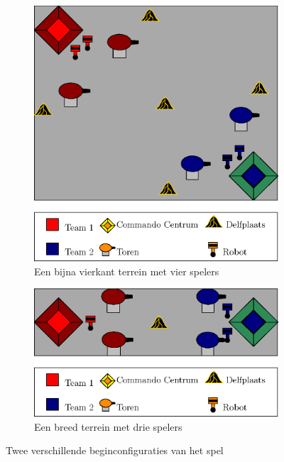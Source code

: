 \documentclass[a4paper,11pt, twoside]{article}
\begin{document}
    \begin{figure}[h]
        \begin{subfigure}{0.5\linewidth}
            \includegraphics[width=\textwidth]{../Graphics/Map1.eps}
            \caption{Een bijna vierkant terrein met vier spelers}
            \label{fig:map1}
        \end{subfigure}\hspace{10mm}
        \begin{subfigure}{0.5\textwidth}
                \includegraphics[width=\textwidth]{../Graphics/Map2.eps}
                \caption{Een breed terrein met drie spelers}
                \label{fig:map2}
        \end{subfigure}
        \caption{Twee verschillende beginconfiguraties van het spel}
    \end{figure}
\end{document}
